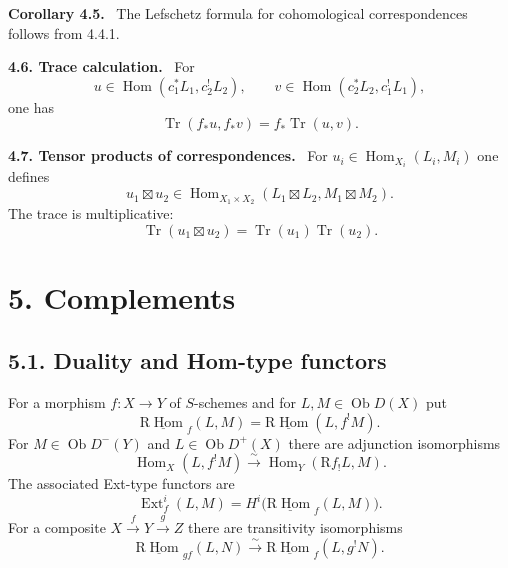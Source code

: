 \documentclass[12pt]{article}
\newcommand{\Hom}{\operatorname{Hom}}
\newcommand{\Ext}{\operatorname{Ext}}
\newcommand{\Tr}{\operatorname{Tr}}
\newcommand{\ob}{\operatorname{Ob}}
\newcommand{\R}{\mathrm R}
\newenvironment{statement}[1]{\par\medskip\noindent\textbf{#1.}\ }{\par\medskip}
\begin{document}
\begin{statement}{Corollary 4.5}
The Lefschetz formula for cohomological correspondences follows from 4.4.1.
\end{statement}

\begin{statement}{4.6. Trace calculation}
For
\[
   u\in\Hom(c_1^*L_1,c_2^!L_2),
   \qquad
   v\in\Hom(c_2^*L_2,c_1^!L_1),
\]
one has
\begin{equation}
   \Tr(f_*u,f_*v)=f_*\Tr(u,v).
   \tag{4.6.1}
\end{equation}
\end{statement}

\begin{statement}{4.7. Tensor products of correspondences}
For $u_i\in\Hom_{X_i}(L_i,M_i)$ one defines
\[
   u_1\boxtimes u_2\in
   \Hom_{X_1\times X_2}(L_1\boxtimes L_2,M_1\boxtimes M_2).
\]
The trace is multiplicative:
\begin{equation}
   \Tr(u_1\boxtimes u_2)=\Tr(u_1)\Tr(u_2).
   \tag{4.7.1}
\end{equation}
\end{statement}

\section*{5. Complements}

\subsection*{5.1. Duality and Hom-type functors}
For a morphism $f:X\to Y$ of $S$-schemes and for $L,M\in\ob D(X)$ put
\begin{equation}
   \underline{\R\Hom}_f(L,M)=\underline{\R\Hom}(L,f^!M).
   \tag{5.1.1}
\end{equation}
For $M\in\ob D^{-}(Y)$ and $L\in\ob D^{+}(X)$ there are adjunction isomorphisms
\begin{equation}
   \Hom_X(L,f^!M)\xrightarrow{\sim}\Hom_Y(\R f_!L,M).
   \tag{5.1.2}
\end{equation}
The associated Ext-type functors are
\begin{equation}
   \Ext^i_f(L,M)=H^i\bigl(\underline{\R\Hom}_f(L,M)\bigr).
   \tag{5.2.1}
\end{equation}
For a composite $X\xrightarrow{f}Y\xrightarrow{g}Z$ there are transitivity isomorphisms
\begin{equation}
   \underline{\R\Hom}_{gf}(L,N)\xrightarrow{\sim}
   \underline{\R\Hom}_f(L,g^!N).
   \tag{5.3.1}
\end{equation}
\end{document}
